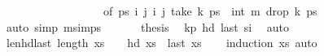 \begin{isabellebody}
\ \ \ \ \ \ \ \ \ \ \ \ \ \ \ \ \ \ of\ ps\ i\ j\ i{\isacharprime}{\kern0pt}\ j{\isacharprime}{\kern0pt}\ {\isachardoublequoteopen}take\ k\ ps\ {}\ {\isachardoublequoteopen}int\ m\ {\isachardoublequoteopen}drop\ k\ ps\ \isanewline
\ \ \ \ \isamarkupfalse%
\ {\isacharparenleft}{\kern0pt}auto\ simp{\isacharcolon}{\kern0pt}\ m{\isacharunderscore}{\kern0pt}simps{\isacharparenright}{\kern0pt}\isanewline
\ \ \isanewline
\ \ \isamarkupfalse%
\ {\isacharquery}{\kern0pt}thesis\ \isamarkupfalse%
\ kp\ hd\ last\ si\ \isamarkupfalse%
\ auto\isanewline
{}\isamarkupfalse%
%
\endisatagproof
{\isafoldproof}%
%
\isadelimproof
\isanewline
%
\endisadelimproof
\isanewline
{}\isamarkupfalse%
\ len{}{\isacharunderscore}{\kern0pt}hd{\isacharunderscore}{\kern0pt}last{\isacharcolon}{\kern0pt}\ {\isachardoublequoteopen}length\ xs\ {\isacharequal}{\kern0pt}\ {}\ {\isasymLongrightarrow}\ hd\ xs\ {\isacharequal}{\kern0pt}\ last\ xs{\isachardoublequoteclose}\isanewline
%
\isadelimproof
\ \ %
\endisadelimproof
%
\isatagproof
{}\isamarkupfalse%
\ {\isacharparenleft}{\kern0pt}induction\ xs{\isacharparenright}{\kern0pt}\ auto%
\endisatagproof
{\isafoldproof}%
%
\isadelimproof
%
\endisadelimproof
%
\begin{isamarkuptext}%

\end{isamarkuptext}
\end{isabellebody}

